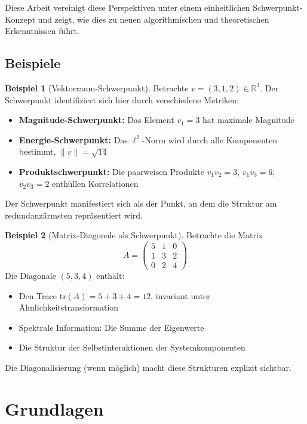 \documentclass[a4paper,12pt]{article}
\theoremstyle{definition}
\newtheorem{beispiel}{Beispiel}
\begin{document}
Diese Arbeit vereinigt diese Perspektiven unter einem einheitlichen Schwerpunkt-Konzept und zeigt, wie dies zu neuen algorithmischen und theoretischen Erkenntnissen führt.

\subsection{Beispiele}

\begin{beispiel}[Vektorraum-Schwerpunkt]
Betrachte $v = (3, 1, 2) \in \mathbb{R}^3$. Der Schwerpunkt identifiziert sich hier durch verschiedene Metriken:
\begin{itemize}
\item \textbf{Magnitude-Schwerpunkt:} Das Element $v_1 = 3$ hat maximale Magnitude
\item \textbf{Energie-Schwerpunkt:} Das $\ell^2$-Norm wird durch alle Komponenten bestimmt, $\|v\| = \sqrt{14}$
\item \textbf{Produktschwerpunkt:} Die paarweisen Produkte $v_1 v_2 = 3$, $v_1 v_3 = 6$, $v_2 v_3 = 2$ enthüllen Korrelationen
\end{itemize}
Der Schwerpunkt manifestiert sich als der Punkt, an dem die Struktur am redundanzärmsten repräsentiert wird.
\end{beispiel}

\begin{beispiel}[Matrix-Diagonale als Schwerpunkt]
Betrachte die Matrix
\[
A = \begin{pmatrix} 5 & 1 & 0 \\ 1 & 3 & 2 \\ 0 & 2 & 4 \end{pmatrix}
\]
Die Diagonale $(5, 3, 4)$ enthält:
\begin{itemize}
\item Den Trace $\text{tr}(A) = 5 + 3 + 4 = 12$, invariant unter Ähnlichkeitstransformation
\item Spektrale Information: Die Summe der Eigenwerte
\item Die Struktur der Selbstinteraktionen der Systemkomponenten
\end{itemize}
Die Diagonalisierung (wenn möglich) macht diese Strukturen explizit sichtbar.
\end{beispiel}

\section{Grundlagen}
\end{document}
